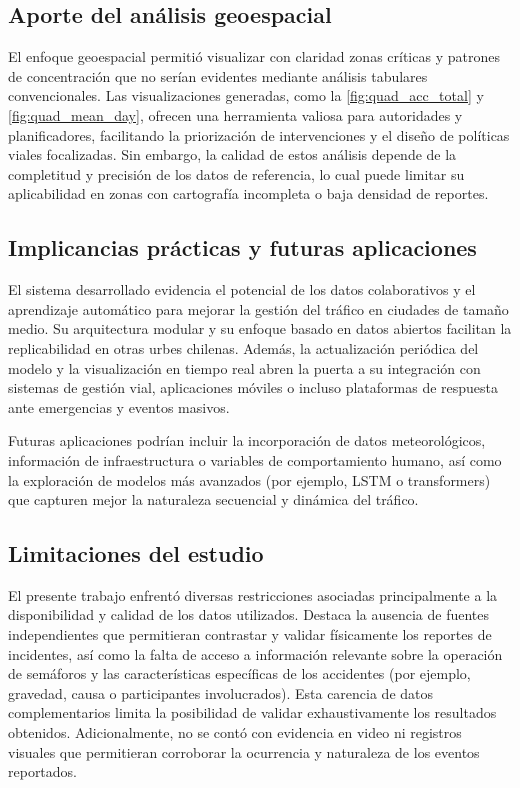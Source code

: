 \documentclass[12pt]{article}
\begin{document}
\subsection{Aporte del análisis geoespacial}

El enfoque geoespacial permitió visualizar con claridad zonas críticas y patrones de concentración que no serían evidentes mediante análisis tabulares convencionales. Las visualizaciones generadas, como la \autoref{fig:quad_acc_total} y \autoref{fig:quad_mean_day}, ofrecen una herramienta valiosa para autoridades y planificadores, facilitando la priorización de intervenciones y el diseño de políticas viales focalizadas. Sin embargo, la calidad de estos análisis depende de la completitud y precisión de los datos de referencia, lo cual puede limitar su aplicabilidad en zonas con cartografía incompleta o baja densidad de reportes.

\subsection{Implicancias prácticas y futuras aplicaciones}

El sistema desarrollado evidencia el potencial de los datos colaborativos y el aprendizaje automático para mejorar la gestión del tráfico en ciudades de tamaño medio. Su arquitectura modular y su enfoque basado en datos abiertos facilitan la replicabilidad en otras urbes chilenas. Además, la actualización periódica del modelo y la visualización en tiempo real abren la puerta a su integración con sistemas de gestión vial, aplicaciones móviles o incluso plataformas de respuesta ante emergencias y eventos masivos.

Futuras aplicaciones podrían incluir la incorporación de datos meteorológicos, información de infraestructura o variables de comportamiento humano, así como la exploración de modelos más avanzados (por ejemplo, LSTM o transformers) que capturen mejor la naturaleza secuencial y dinámica del tráfico.

\subsection{Limitaciones del estudio}

El presente trabajo enfrentó diversas restricciones asociadas principalmente a la disponibilidad y calidad de los datos utilizados. Destaca la ausencia de fuentes independientes que permitieran contrastar y validar físicamente los reportes de incidentes, así como la falta de acceso a información relevante sobre la operación de semáforos y las características específicas de los accidentes (por ejemplo, gravedad, causa o participantes involucrados). Esta carencia de datos complementarios limita la posibilidad de validar exhaustivamente los resultados obtenidos. Adicionalmente, no se contó con evidencia en video ni registros visuales que permitieran corroborar la ocurrencia y naturaleza de los eventos reportados.
\end{document}
